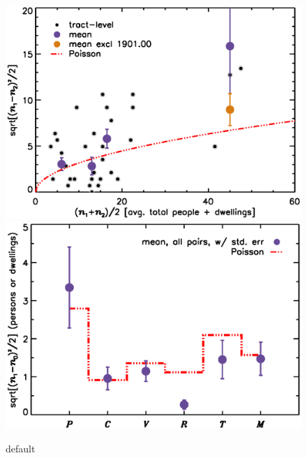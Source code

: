 \documentclass[11pt,twocolumn]{article}
\begin{document}
%
%

\begin{figure}[]
\centering
	\includegraphics[width=\linewidth]{intDupeChar}\\
	\includegraphics[width=\linewidth]{catDupeChar}
\caption{default}
\label{fig:dupeChar}
\end{figure}
\end{document}
